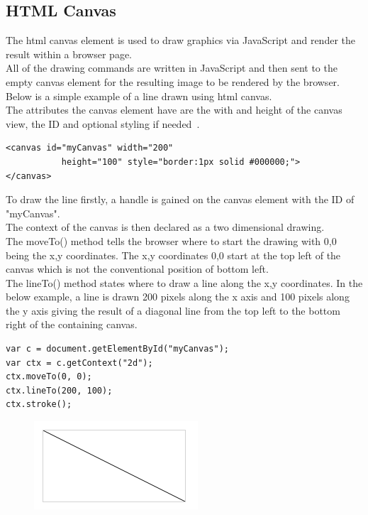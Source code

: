 \subsection{HTML Canvas}
The html canvas element is used to draw graphics via JavaScript and render the result within a browser page.\\
All of the drawing commands are written in JavaScript and then sent to the empty canvas element for the resulting image to be rendered by the browser.\\
Below is a simple example of a line drawn using html canvas.~\cite{CanvasDoc:online}\\
The attributes the canvas element have are the with and height of the canvas view, the ID and optional styling if needed~\cite{CanvasExample:online}.

\begin{verbatim}
<canvas id="myCanvas" width="200" 
           height="100" style="border:1px solid #000000;">
</canvas>
\end{verbatim}
To draw the line firstly, a handle is gained on the canvas element with the ID of "myCanvas".\\
The context of the canvas is then declared as a two dimensional drawing.\\
The moveTo() method tells the browser where to start the drawing with 0,0 being the x,y coordinates.
The x,y coordinates 0,0 start at the top left of the canvas which is not the conventional position of bottom left.\\
The lineTo() method states where to draw a line along the x,y coordinates. In the below example, a line is drawn 200 pixels along the x axis and 100 pixels along the y axis giving the result of a diagonal line from the top left to the bottom right of the containing canvas.~\cite{CanvasExample:online,CanvasDoc:online}
\begin{verbatim}
var c = document.getElementById("myCanvas");
var ctx = c.getContext("2d");
ctx.moveTo(0, 0);
ctx.lineTo(200, 100);
ctx.stroke();
\end{verbatim}
\begin{figure}[H]
	\centering
	\includegraphics[width=0.7\linewidth]{img/canvasLine}
	\caption{}
	\label{fig:canvasline}
\end{figure}


